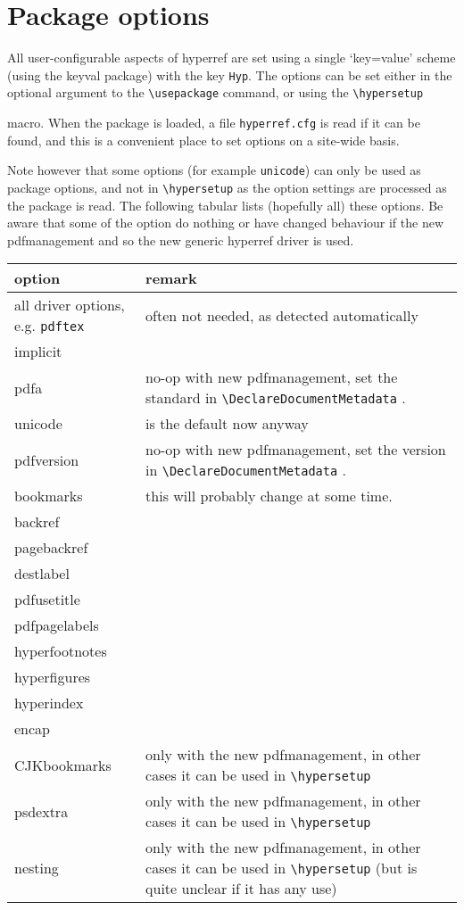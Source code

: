 \documentclass{article}
\newcommand*{\cs}[1]{%
  \texttt{\textbackslash #1}%
}
\newcommand*{\xpackage}[1]{\textsf{#1}}
\begin{document}
\section{Package options}

All user-configurable aspects of \xpackage{hyperref} are set using a
single `key=value' scheme (using the \xpackage{keyval} package) with the
key \texttt{Hyp}. The options can be set either in the optional argument
to the \cs{usepackage} command, or using the \cs{hypersetup}
macro. When the package is loaded, a file \texttt{hyperref.cfg} is read
if it can be found, and this is a convenient place to set options on a
site-wide basis.

Note however that some options (for example \texttt{unicode}) can only be used as
package options, and not in \verb|\hypersetup| as the option settings are processed
as the package is read. The following tabular lists (hopefully all) these options.
Be aware that some of the option do nothing or have
changed behaviour if the new pdfmanagement and so the new generic \xpackage{hyperref} driver is used.

\begin{tabular}{>{\ttfamily}l>{\raggedright\arraybackslash}p{5cm}}
option     & remark \\\hline
all driver options, e.g. \texttt{pdftex} & often not needed, as detected automatically\\
implicit   \\
pdfa       & no-op with new pdfmanagement, set the standard in \cs{DeclareDocumentMetadata}.\\
unicode    & is the default now anyway\\
pdfversion & no-op with new pdfmanagement, set the version in \cs{DeclareDocumentMetadata}.\\
bookmarks  & this will probably change at some time. \\
backref &\\
pagebackref & \\
destlabel  &\\
pdfusetitle &\\
pdfpagelabels &\\
hyperfootnotes &\\
hyperfigures&\\
hyperindex &\\
encap &\\
CJKbookmarks & only with the new pdfmanagement, in other cases it can be used in \cs{hypersetup}\\
psdextra     & only with the new pdfmanagement, in other cases it can be used in \cs{hypersetup}\\
nesting      & only with the new pdfmanagement, in other cases it can be used in \cs{hypersetup} (but
               is quite unclear if it has any use)\\

\end{tabular}
\end{document}
